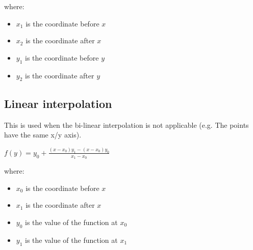 where:
\begin{itemize}
\item $x_1$ is the coordinate before $x$
\item $x_2$ is the coordinate after $x$
\item $y_1$ is the coordinate before $y$
\item $y_2$ is the coordinate after $y$
\end{itemize}
\subsection{Linear interpolation}
This is used when the bi-linear interpolation is not applicable (e.g. The points have the same x/y axis).

$f(y) = y_0 + \frac{(x - x_0)y_1 - (x - x_0)y_0}{x_1 - x_0}$

where:
\begin{itemize}
\item $x_0$ is the coordinate before $x$
\item $x_1$ is the coordinate after $x$
\item $y_0$ is the value of the function at $x_0$
\item $y_1$ is the value of the function at $x_1$
\end{itemize}


